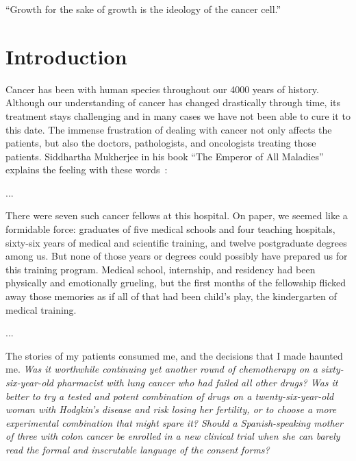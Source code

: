 
\begin{savequote}[.5\linewidth]
  ``Growth for the sake of growth is the ideology of the cancer cell.''
\end{savequote}
\chapter{Introduction}
\label{ch:intro}
Cancer has been with human species throughout our 4000 years of history.
Although our understanding of cancer has changed drastically through time, its
treatment stays challenging and in many cases we have not been able to cure it
to this date. The immense frustration of dealing with cancer not only affects
the patients, but also the doctors, pathologists, and oncologists treating
those patients. Siddhartha Mukherjee in his book ``The Emperor of All
Maladies'' explains the feeling with these
words~\cite[prologue]{the-emperor-of-all-maladies}:

\begin{displayquote}
  ...
  
  There were seven such cancer fellows at this hospital. On paper, we seemed
  like a formidable force: graduates of five medical schools and four teaching
  hospitals, sixty-six years of medical and scientific training, and twelve
  postgraduate degrees among us. But none of those years or degrees could
  possibly have prepared us for this training program. Medical school,
  internship, and residency had been physically and emotionally grueling, but
  the first months of the fellowship flicked away those memories as if all of
  that had been child's play, the kindergarten of medical training.

  ...

  The stories of my patients consumed me, and the decisions that I made haunted
  me. \emph{Was it worthwhile continuing yet another round of chemotherapy on a
    sixty-six-year-old pharmacist with lung cancer who had failed all other
    drugs? Was it better to try a tested and potent combination of drugs on a
    twenty-six-year-old woman with Hodgkin's disease and risk losing her
    fertility, or to choose a more experimental combination that might spare
    it? Should a Spanish-speaking mother of three with colon cancer be enrolled
    in a new clinical trial when she can barely read the formal and inscrutable
    language of the consent forms?}
\end{displayquote}

